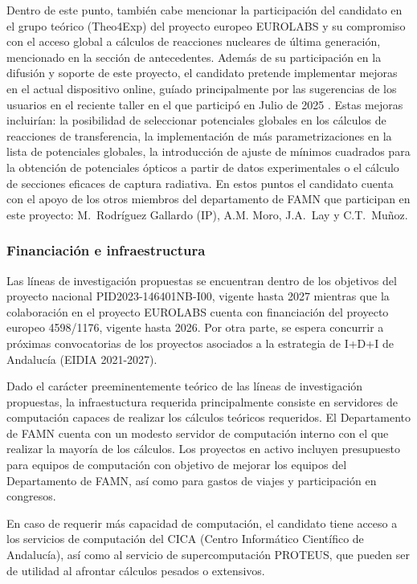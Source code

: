 \documentclass[a4paper,12pt,twoside]{article}
\begin{document}
Dentro de este punto, también cabe mencionar la participación del candidato en el grupo teórico (Theo4Exp) del proyecto europeo EUROLABS \cite{eurolabs} y su compromiso con el acceso global a cálculos de reacciones nucleares de última generación, mencionado en la sección de antecedentes. Además de su participación en la difusión y soporte de este proyecto, el candidato pretende implementar mejoras en el actual dispositivo online, guíado principalmente por las sugerencias de los usuarios en el reciente taller en el que participó en Julio de 2025 \cite{Workshop_Trento_25}. Estas mejoras incluirían: la posibilidad de seleccionar potenciales globales en los cálculos de reacciones de transferencia, la implementación de más parametrizaciones en la lista de potenciales globales, la introducción de ajuste de mínimos cuadrados para la obtención de potenciales ópticos a partir de datos experimentales o el cálculo de secciones eficaces de captura radiativa. En estos puntos el candidato cuenta con el apoyo de los otros miembros del departamento de FAMN que participan en este proyecto: M.~Rodríguez Gallardo (IP), A.M. Moro, J.A.~Lay y C.T.~Muñoz.

\subsubsection{Financiación e infraestructura}

Las líneas de investigación propuestas se encuentran dentro de los objetivos del proyecto nacional PID2023-146401NB-I00, vigente hasta 2027 mientras que la colaboración en el proyecto EUROLABS cuenta con financiación del proyecto europeo 4598/1176, vigente hasta 2026. Por otra parte, se espera concurrir a próximas convocatorias de los proyectos asociados a la estrategia de I+D+I de Andalucía (EIDIA 2021-2027).

Dado el carácter preeminentemente teórico de las líneas de investigación propuestas, la infraestuctura requerida principalmente consiste en servidores de computación capaces de realizar los cálculos teóricos requeridos. El Departamento de FAMN cuenta con un modesto servidor de computación interno con el que realizar la mayoría de los cálculos. Los proyectos en activo incluyen presupuesto para equipos de computación con objetivo de mejorar los equipos del Departamento de FAMN, así como para gastos de viajes y participación en congresos. 

En caso de requerir más capacidad de computación, el candidato tiene acceso a los servicios de computación del CICA (Centro Informático
Científico de Andalucía), así como al servicio de supercomputación PROTEUS, que pueden ser de utilidad al afrontar cálculos pesados o extensivos.

%


\end{document}
